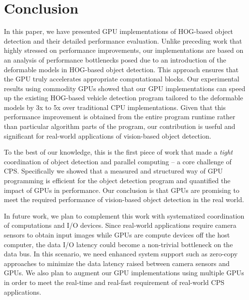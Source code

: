 \section{Conclusion}
\label{sec:conclusion}

In this paper, we have presented GPU implementations of HOG-based object
detection and their detailed performance evaluation.
Unlike preceding work that highly stressed on performance improvements,
our implementations are based on an analysis of performance bottlenecks
posed due to an introduction of the deformable models in HOG-based
object detection.
This approach ensures that the GPU truly accelerates appropriate
computational blocks.
Our experimental results using commodity GPUs showed that our GPU
implementations can speed up the existing HOG-based vehicle detection
program tailored to the deformable models by 3x to 5x over traditional
CPU implementations.
Given that this performance improvement is obtained from the entire
program runtime rather than particular algorithm parts of the program,
our contribution is useful and significant for real-world applications
of vision-based object detection. 

To the best of our knowledge, this is the first piece of work that made
a \textit{tight} coordination of object detection and parallel computing
-- a core challenge of CPS.
Specifically we showed that a measured and structured way of GPU
programming is efficient for the object detection program and quantified
the impact of GPUs in performance.
Our conclusion is that GPUs are promising to meet the required
performance of vision-based object detection in the real world.

In future work, we plan to complement this work with systematized
coordination of computations and I/O devices.
Since real-world applications require camera sensors to obtain input
images while GPUs are compute devices off the host computer, the data
I/O latency could become a non-trivial bottleneck on the data bus.
In this scenario, we need enhanced system support such as zero-copy
approaches \cite{Kato13} to minimize the data latency raised between
camera sensors and GPUs.
We also plan to augment our GPU implementations using multiple GPUs in
order to meet the real-time and real-fast requirement of real-world CPS
applications.
